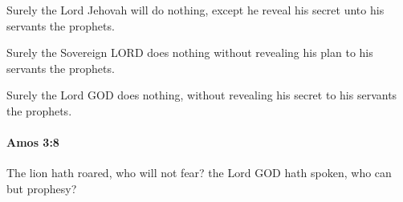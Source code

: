			\begin{versebox}
					\item[BHS] 
					\item[LXX] 
					\item[ASV] Surely the Lord Jehovah will do nothing, except he reveal his secret unto his servants the prophets.
					\item[NIV] Surely the Sovereign LORD does nothing without revealing his plan to his servants the prophets.
					\item[NRSV] Surely the Lord GOD does nothing, without revealing his secret to his servants the prophets.
			\end{versebox}

		\paragraph{Amos 3:8} %
			\label{AMOS-3-8}

			The lion hath roared, who will not fear? the Lord GOD hath spoken, who can but prophesy?

